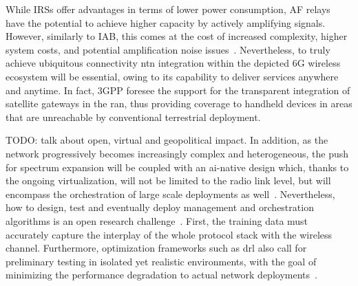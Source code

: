 While IRSs offer advantages in terms of lower power consumption, AF relays have the potential to achieve higher capacity by actively amplifying signals. However, similarly to IAB, this comes at the cost of increased complexity, higher system costs, and potential amplification noise issues~\cite{huang2019reconfigurable}.
Nevertheless, to truly achieve ubiquitous connectivity \gls{ntn} integration within the depicted 6G wireless ecosystem will be essential, owing to its capability to deliver services anywhere and anytime. In fact, 3GPP foresee the support for the transparent integration of satellite gateways in the \gls{ran}, thus providing coverage to handheld devices in areas that are unreachable by conventional terrestrial deployment.


TODO: talk about open, virtual and geopolitical impact.
In addition, as the network progressively becomes increasingly complex and heterogeneous, the push for spectrum expansion will be coupled with an \gls{ai}-native design which, thanks to the ongoing virtualization, will not be limited to the radio link level, but will encompass the orchestration of large scale deployments as well~\cite{polese2023understanding}.
Nevertheless, how to design, test and eventually deploy management and orchestration algorithms is an open research challenge~\cite{polese2022colo}.
First, the training data must accurately capture the interplay of the whole protocol stack with the wireless channel. Furthermore, optimization frameworks such as \gls{drl} also call for preliminary testing in isolated yet realistic environments, with the goal of minimizing the performance degradation to actual network deployments~\cite{lacava2022programmable, amir2023safehaul}.

